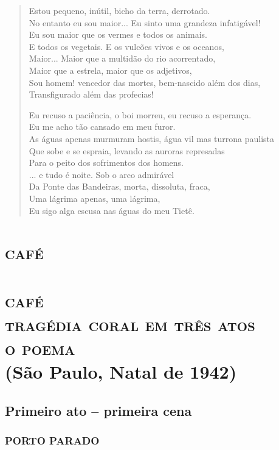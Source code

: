 \begin{verse}
Estou pequeno, inútil, bicho da terra, derrotado.\\
No entanto eu sou maior... Eu sinto uma grandeza infatigável!\\
Eu sou maior que os vermes e todos os animais.\\
E todos os vegetais. E os vulcões vivos e os oceanos,\\
Maior... Maior que a multidão do rio acorrentado,\\
Maior que a estrela, maior que os adjetivos,\\
Sou homem! vencedor das mortes, bem-nascido além dos dias,\\
Transfigurado além das profecias!

Eu recuso a paciência, o boi morreu, eu recuso a esperança.\\
Eu me acho tão cansado em meu furor.\\
As águas apenas murmuram hostis, água vil mas turrona paulista\\
Que sobe e se espraia, levando as auroras represadas\\
Para o peito dos sofrimentos dos homens.\\
... e tudo é noite. Sob o arco admirável\\
Da Ponte das Bandeiras, morta, dissoluta, fraca,\\
Uma lágrima apenas, uma lágrima,\\
Eu sigo alga escusa nas águas do meu Tietê.
\end{verse}


\part{\textsc{café}}
\removeepigraph


\part*{\textsc{café}\\\textsc{tragédia coral em três atos}\\\textsc{o poema}\\
(São Paulo, Natal de 1942)}


\chapter{Primeiro ato -- primeira cena}


\section{PORTO PARADO}

